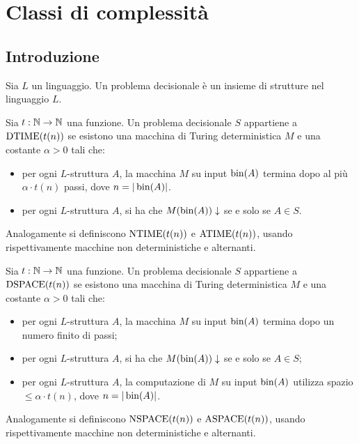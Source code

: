 \chapter{Classi di complessità}

\section{Introduzione}

\begin{definizione}
  Sia $L$ un linguaggio. Un problema decisionale è un insieme di strutture nel linguaggio $L$.
\end{definizione}

\begin{definizione}
  Sia $t:\mathbb{N}\to\mathbb{N}$ una funzione.
  Un problema decisionale $S$ appartiene a $\operatorname{DTIME}(t(n))$ se esistono una macchina di Turing deterministica $M$ e una costante $\alpha>0$ tali che:
  \begin{itemize}
    \item per ogni $L$-struttura $A$, la macchina $M$ su input $\operatorname{bin}(A)$ termina dopo al più $\alpha\cdot t(n)$ passi, dove $n=|\operatorname{bin}(A)|$.
    \item per ogni $L$-struttura $A$, si ha che $M(\operatorname{bin}(A))\downarrow$ se e solo se $A\in S$.
  \end{itemize}
  Analogamente si definiscono $\operatorname{NTIME}(t(n))$ e $\operatorname{ATIME}(t(n))$, usando rispettivamente macchine non deterministiche e alternanti.
\end{definizione}


\begin{definizione}
  Sia $t:\mathbb{N}\to\mathbb{N}$ una funzione.
  Un problema decisionale $S$ appartiene a $\operatorname{DSPACE}(t(n))$ se esistono una macchina di Turing deterministica $M$ e una costante $\alpha>0$ tali che:
  \begin{itemize}
    \item per ogni $L$-struttura $A$, la macchina $M$ su input $\operatorname{bin}(A)$ termina dopo un numero finito di passi;
    \item per ogni $L$-struttura $A$, si ha che $M(\operatorname{bin}(A))\downarrow$ se e solo se $A\in S$;
    \item per ogni $L$-struttura $A$, la computazione di $M$ su input $\operatorname{bin}(A)$ utilizza spazio $\leq\alpha\cdot t(n)$, dove $n=|\operatorname{bin}(A)|$.
  \end{itemize}
  Analogamente si definiscono $\operatorname{NSPACE}(t(n))$ e $\operatorname{ASPACE}(t(n))$, usando rispettivamente macchine non deterministiche e alternanti.
\end{definizione}

